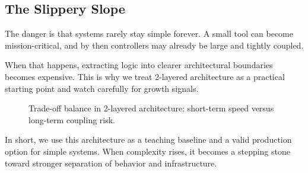 \subsection{The Slippery Slope}
\label{sec:2_layered_slippery_slope}

The danger is that systems rarely stay simple forever. A small tool can become mission-critical, and by then controllers may already be large and tightly coupled.

When that happens, extracting logic into clearer architectural boundaries becomes expensive. This is why we treat 2-layered architecture as a practical starting point and watch carefully for growth signals.

\begin{figure}[htbp]
    \centering
    
    \caption{Trade-off balance in 2-layered architecture: short-term speed versus long-term coupling risk.}
    \label{fig:2_layered_tradeoffs_balance}
\end{figure}

In short, we use this architecture as a teaching baseline and a valid production option for simple systems. When complexity rises, it becomes a stepping stone toward stronger separation of behavior and infrastructure.
